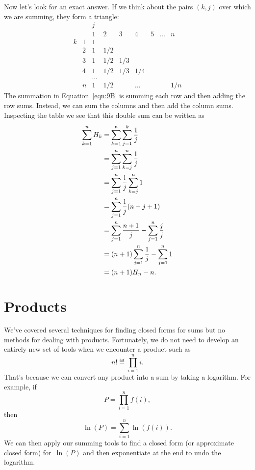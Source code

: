 Now let's look for an exact answer.  If we think about the pairs
$(k,j)$ over which we are summing, they form a triangle:
\[
\begin{array}{cc|ccccccc}
 &  & j &   &   &   &   &       &   \\
 &  & 1 & 2 & 3 & 4 & 5 & \dots & n \\
\hline
k & 1 & 1\\
  & 2 &1&1/2\\
  & 3 &1&1/2&1/3\\
  & 4 &1&1/2&1/3&1/4\\
  &   &\dots\\
  & n &1&1/2&&\dots&&&1/n
\end{array}
\]
The summation in Equation~\ref{eqn:9B} is summing each row and then
adding the row sums.  Instead, we can sum the columns and then add the
column sums.  Inspecting the table we see that this double sum can be
written as
\begingroup
{}
\begin{align}
\sum_{k=1}^n H_k &= \sum_{k=1}^n \sum_{j=1}^k \frac{1}{j}\notag\\
&= \sum_{j=1}^n \sum_{k=j}^n \frac{1}{j}\notag\\
&= \sum_{j=1}^n \frac{1}{j} \sum_{k=j}^n 1\notag\\
&= \sum_{j=1}^n \frac1j (n-j+1)\notag\\
&= \sum_{j=1}^n \frac{n+1}j - \sum_{j=1}^n \frac{j}{j}\notag\\
&= (n+1)\sum_{j=1}^n \frac1j - \sum_{j=1}^n 1\notag\\
&= (n+1)H_n-n.\label{sHk}
\end{align}
\endgroup

\section{Products}

We've covered several techniques for finding closed forms for sums but
no methods for dealing with products.  Fortunately, we do not need to
develop an entirely new set of tools when we encounter a product such
as
\begin{equation}\label{eqn:9P1}
    n! \eqdef \prod_{i = 1}^n i.
\end{equation}
That's because we can convert any product into a sum by taking a
logarithm.  For example, if
\begin{equation*}
    P = \prod_{i  = 1}^n f(i),
\end{equation*}
then
\begin{equation*}
    \ln(P) = \sum_{i = 1}^n \ln(f(i)).
\end{equation*}
We can then apply our summing tools to find a closed form (or
approximate closed form) for~$\ln(P)$ and then exponentiate at the end
to undo the logarithm.

